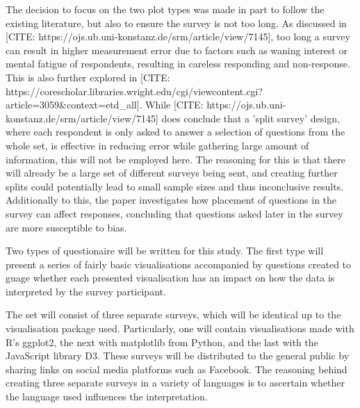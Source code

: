 The decision to focus on the two plot types was made in part to follow the existing literature, but also to ensure the survey is not too long. 
As discussed in [CITE: https://ojs.ub.uni-konstanz.de/srm/article/view/7145], too long a survey can result in higher measurement error due to factors 
such as waning interest or mental fatigue of respondents, resulting in careless responding and non-response. This is also further explored in 
[CITE: https://corescholar.libraries.wright.edu/cgi/viewcontent.cgi?article=3059&context=etd_all]. While 
[CITE: https://ojs.ub.uni-konstanz.de/srm/article/view/7145] does conclude that a 'split survey' design, where each respondent is only asked to 
answer a selection of questions from the whole set, is effective in reducing error while gathering large amount of information, this will not be employed
here. The reasoning for this is that there will already be a large set of different surveys being sent, and creating further splits could potentially lead
to small sample sizes and thus inconclusive results. Additionally to this, the paper investigates how placement of questions in the survey can affect
responses, concluding that questions asked later in the survey are more susceptible to bias. 


% 


Two types of questionaire will be written for this study. The first type will present a series of fairly basic visualisations accompanied
by questions created to guage whether each presented visualisation has an impact on how the data is interpreted by the survey participant.


The set will consist of three separate surveys, which will be identical up to the visualisation package used. Particularly, one will contain 
visualisations made with R's ggplot2, the next with matplotlib from Python, and the last with the JavaScript library D3. These surveys will 
be distributed to the general public by sharing links on social media platforms such as Facebook. The reasoning behind creating three separate 
surveys in a variety of languages is to ascertain whether the language used influences the interpretation. 




